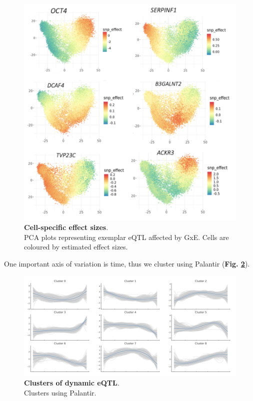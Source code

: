 \begin{figure}[htbp]
\centering
\includegraphics[width=15.5cm]{Chapter6/Fig/sc_structlmm_pcas.png}
\caption[Cell-specific effect sizes]{\textbf{Cell-specific effect sizes}.\\
PCA plots representing exemplar eQTL affected by GxE.
Cells are coloured by estimated effect sizes.}
\label{fig:sc_structlmm_pcas}
\end{figure}

\clearpage

One important axis of variation is time, thus we cluster using Palantir \cite{setty2019characterization}
(\textbf{Fig. \ref{fig:sc_structlmm_clusters}}).

\begin{figure}[h]
\centering
\includegraphics[width=15.5cm]{Chapter6/Fig/sc_structlmm_clusters.png}
\caption[Clusters of dynamic eQTL]{\textbf{Clusters of dynamic eQTL}.\\
Clusters using Palantir.}
\label{fig:sc_structlmm_clusters}
\end{figure}

